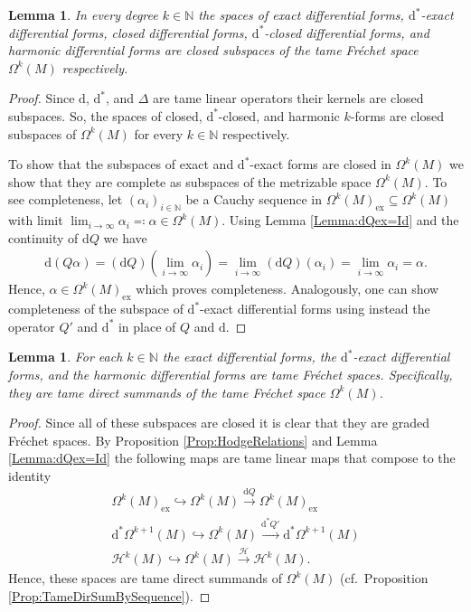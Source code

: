 \documentclass[12pt,a4paper]{article}
\theoremstyle{plain}
\newtheorem{lemma}[theorem]{Lemma}
\theoremstyle{definition}
\newcommand{\N}{\mathbb{N}}
\newcommand{\Forms}[1]{\Omega^{#1}(M)}
\newcommand{\ExForms}[1]{\Forms{#1}_{\mathrm{ex}}}
\newcommand{\Hcal}{\mathcal{H}}
\renewcommand{\d}{\mathrm{d}}
\begin{document}
\begin{lemma}
\label{Lemma:ExFormsClosedSubsp}
In every degree $k\in \N$ the spaces of exact differential forms, $\d^*$-exact differential forms, closed differential forms, $\d^*$-closed differential forms, and harmonic differential forms are closed subspaces of the tame Fréchet space $\Forms{k}$ respectively.
\end{lemma}
\begin{proof}
Since $\d$, $\d^*$, and $\Delta$ are tame linear operators their kernels are closed subspaces. So, the spaces of closed, $\d^*$-closed, and harmonic $k$-forms are closed subspaces of $\Forms{k}$ for every $k\in \N$ respectively.

To show that the subspaces of exact and $\d^*$-exact forms are closed in $\Forms{k}$ we show that they are complete as subspaces of the metrizable space $\Forms{k}$. 
To see completeness, let $(\alpha_i)_{i\in \N}$ be a Cauchy sequence in $\ExForms{k}\subseteq \Forms{k}$ with limit
$\lim_{i\to\infty}\alpha_i\eqqcolon \alpha \in \Forms{k}$. Using Lemma \ref{Lemma:dQex=Id} and the continuity of $\d Q$ we have
\begin{align*}
    \d(Q\alpha)=(\d Q)\left(\lim_{i\to \infty}\alpha_i\right)=\lim_{i\to \infty}(\d Q)(\alpha_i)=\lim_{i\to \infty}\alpha_i=\alpha.
\end{align*}
Hence, $\alpha\in \ExForms{k}$ which proves completeness.
Analogously, one can show completeness of the subspace of $\d^*$-exact differential forms using instead the operator $Q'$ and $\d^*$ in place of $Q$ and $\d$.
\end{proof}

\begin{lemma}
For each $k\in \N$ the exact differential forms, the $\d^*$-exact differential forms, and the harmonic differential forms are tame Fréchet spaces. Specifically, they are tame direct summands of the tame Fréchet space $\Forms{k}$.
\end{lemma}
\begin{proof}
Since all of these subspaces are closed it is clear that they are graded Fréchet spaces. 
By Proposition \ref{Prop:HodgeRelations} and Lemma \ref{Lemma:dQex=Id} the following maps are tame linear maps that compose to the identity
\begin{align*}
    \ExForms{k}\hookrightarrow \Forms{k}\xrightarrow{\d Q}\ExForms{k}\\
    \d^*\Forms{k+1}\hookrightarrow\Forms{k}\xrightarrow{\d^*Q'}\d^*\Forms{k+1}\\
    \Hcal^k(M)\hookrightarrow\Forms{k}\xrightarrow{\Hcal}\Hcal^k(M).
\end{align*}
Hence, these spaces are tame direct summands of $\Forms{k}$ (cf.~Proposition \ref{Prop:TameDirSumBySequence}).
\end{proof}
\end{document}

